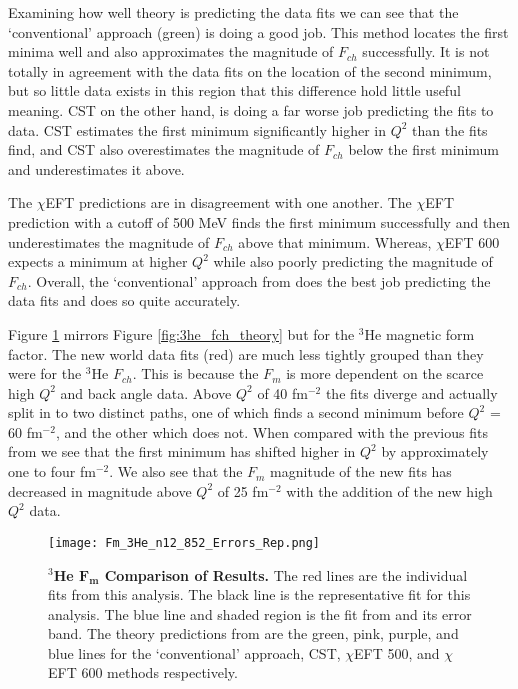 Examining how well theory is predicting the data fits we can see that the `conventional' approach (green) is doing a good job. This method locates the first minima well and also approximates the magnitude of $F_{ch}$ successfully. It is not totally in agreement with the data fits on the location of the second minimum, but so little data exists in this region that this difference hold little useful meaning. CST on the other hand, is doing a far worse job predicting the fits to data. CST estimates the first minimum significantly higher in $Q^2$ than the fits find, and CST also overestimates the magnitude of $F_{ch}$ below the first minimum and underestimates it above. 

The $\chi$EFT predictions are in disagreement with one another. The $\chi$EFT prediction with a cutoff of 500 MeV finds the first minimum successfully and then underestimates the magnitude of $F_{ch}$ above that minimum. Whereas, $\chi$EFT 600 expects a minimum at higher $Q^2$ while also poorly predicting the magnitude of $F_{ch}$. Overall, the `conventional' approach from \cite{Article:Marcucci} does the best job predicting the data fits and does so quite accurately. 

Figure \ref{fig:3he_fm_theory} mirrors Figure \ref{fig:3he_fch_theory} but for the $^3$He magnetic form factor. The new world data fits (red) are much less tightly grouped than they were for the $^3$He $F_{ch}$. This is because the $F_m$ is more dependent on the scarce high $Q^2$ and back angle data. Above $Q^2$ of 40 fm$^{-2}$ the fits diverge and actually split in to two distinct paths, one of which finds a second minimum before $Q^2$ = 60 fm$^{-2}$, and the other which does not. When compared with the previous fits from \cite{Article:Amroun} we see that the first minimum has shifted higher in $Q^2$ by approximately one to four fm$^{-2}$. We also see that the $F_m$ magnitude of the new fits has decreased in magnitude above $Q^2$ of 25 fm$^{-2}$ with the addition of the new high $Q^2$ data.

\begin{figure}[!ht]
	\begin{center}
	\texttt{[image: Fm\_3He\_n12\_852\_Errors\_Rep.png]}
	\end{center}
	\caption[$^3$He $F_m$ Comparison of Results]{
	{\bf{$^3$He $\boldsymbol{F_m}$ Comparison of Results.}} The red lines are the individual fits from this analysis. The black line is the representative fit for this analysis. The blue line and shaded region is the fit from \cite{Article:Amroun} and its error band. The theory predictions from \cite{Article:Marcucci} are the green, pink, purple, and blue lines for the `conventional' approach, CST, $\chi$EFT 500, and $\chi$EFT 600 methods respectively.}
	\label{fig:3he_fm_theory}
\end{figure}


